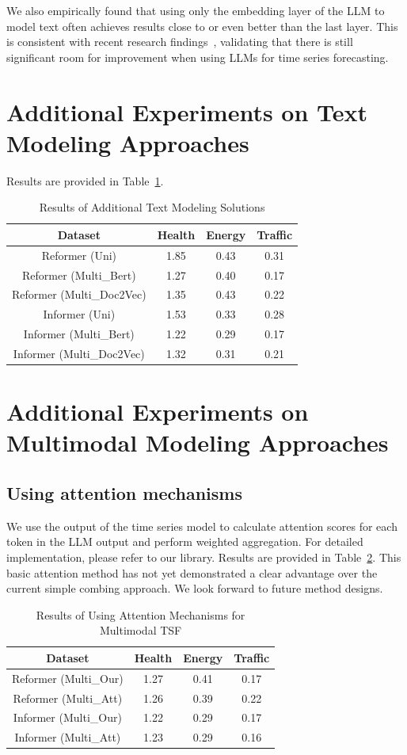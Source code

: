 We also empirically found that using only the embedding layer of the LLM to model text often achieves results close to or even better than the last layer. This is consistent with recent research findings~\cite{tan2024language}, validating that there is still significant room for improvement when using LLMs for time series forecasting.
\section{Additional Experiments on Text Modeling Approaches}\label{app:tm}
Results are provided in Table~\ref{tab:TI}.
\begin{table}
\centering
\begin{tabular}{cccc} 
\hline
Dataset                   & Health & Energy & Traffic  \\ 
\hline
Reformer (Uni)            & 1.85   & 0.43   & 0.31     \\ 
Reformer (Multi\_Bert)    & 1.27   & 0.40   & 0.17     \\ 
Reformer (Multi\_Doc2Vec) & 1.35   & 0.43   & 0.22     \\ 
Informer (Uni)            & 1.53   & 0.33   & 0.28     \\ 
Informer (Multi\_Bert)    & 1.22   & 0.29   & 0.17     \\ 
Informer (Multi\_Doc2Vec) & 1.32   & 0.31   & 0.21     \\
\hline
\end{tabular}
\caption{Results of Additional Text Modeling Solutions\label{tab:TI}}
\end{table}
\section{Additional Experiments on Multimodal Modeling Approaches}\label{app:mma}
\subsection{Using attention mechanisms}
We use the output of the time series model to calculate attention scores for each token in the LLM output and perform weighted aggregation. For detailed implementation, please refer to our library. Results are provided in Table~\ref{tab:AMM}. This basic attention method has not yet demonstrated a clear advantage over the current simple combing approach. We look forward to future method designs.
\begin{table}[h]
\centering
\begin{tabular}{cccc}
\hline
Dataset               & Health & Energy & Traffic \\ \hline
Reformer (Multi\_Our) & 1.27   & 0.41   & 0.17    \\
Reformer (Multi\_Att)  & 1.26   & 0.39   & 0.22    \\
Informer (Multi\_Our) & 1.22   & 0.29   & 0.17    \\
Informer (Multi\_Att)  & 1.23   & 0.29   & 0.16    \\ \hline
\end{tabular}
\caption{Results of Using Attention Mechanisms for Multimodal TSF\label{tab:AMM}}

\end{table}

